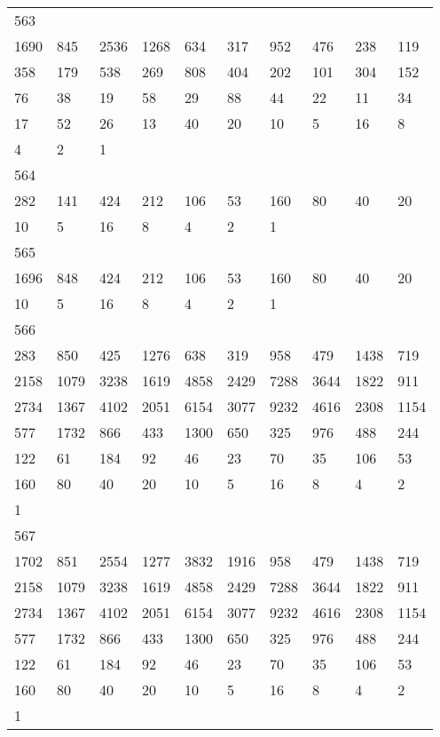 \begin{longtable}{*{10}{l}}
563&&&&&&&&&\\
1690& 845& 2536& 1268& 634& 317& 952& 476& 238& 119\\
358& 179& 538& 269& 808& 404& 202& 101& 304& 152\\
76& 38& 19& 58& 29& 88& 44& 22& 11& 34\\
17& 52& 26& 13& 40& 20& 10& 5& 16& 8\\
4& 2& 1& \\

564&&&&&&&&&\\
282& 141& 424& 212& 106& 53& 160& 80& 40& 20\\
10& 5& 16& 8& 4& 2& 1& \\

565&&&&&&&&&\\
1696& 848& 424& 212& 106& 53& 160& 80& 40& 20\\
10& 5& 16& 8& 4& 2& 1& \\

566&&&&&&&&&\\
283& 850& 425& 1276& 638& 319& 958& 479& 1438& 719\\
2158& 1079& 3238& 1619& 4858& 2429& 7288& 3644& 1822& 911\\
2734& 1367& 4102& 2051& 6154& 3077& 9232& 4616& 2308& 1154\\
577& 1732& 866& 433& 1300& 650& 325& 976& 488& 244\\
122& 61& 184& 92& 46& 23& 70& 35& 106& 53\\
160& 80& 40& 20& 10& 5& 16& 8& 4& 2\\
1& \\

567&&&&&&&&&\\
1702& 851& 2554& 1277& 3832& 1916& 958& 479& 1438& 719\\
2158& 1079& 3238& 1619& 4858& 2429& 7288& 3644& 1822& 911\\
2734& 1367& 4102& 2051& 6154& 3077& 9232& 4616& 2308& 1154\\
577& 1732& 866& 433& 1300& 650& 325& 976& 488& 244\\
122& 61& 184& 92& 46& 23& 70& 35& 106& 53\\
160& 80& 40& 20& 10& 5& 16& 8& 4& 2\\
1& \\


\end{longtable}
